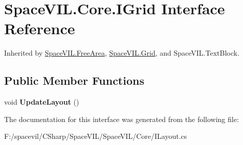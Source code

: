 \hypertarget{interface_space_v_i_l_1_1_core_1_1_i_grid}{}\section{Space\+V\+I\+L.\+Core.\+I\+Grid Interface Reference}
\label{interface_space_v_i_l_1_1_core_1_1_i_grid}


Inherited by \mbox{\hyperlink{class_space_v_i_l_1_1_free_area}{Space\+V\+I\+L.\+Free\+Area}}, \mbox{\hyperlink{class_space_v_i_l_1_1_grid}{Space\+V\+I\+L.\+Grid}}, and Space\+V\+I\+L.\+Text\+Block.

\subsection*{Public Member Functions}
\begin{DoxyCompactItemize}
\item 
\mbox{\label{interface_space_v_i_l_1_1_core_1_1_i_grid_a4093736c7b8ffddcdc79413b6de8579a}} 
void {\bfseries Update\+Layout} ()
\end{DoxyCompactItemize}


The documentation for this interface was generated from the following file\+:\begin{DoxyCompactItemize}
\item 
F\+:/spacevil/\+C\+Sharp/\+Space\+V\+I\+L/\+Space\+V\+I\+L/\+Core/I\+Layout.\+cs\end{DoxyCompactItemize}
